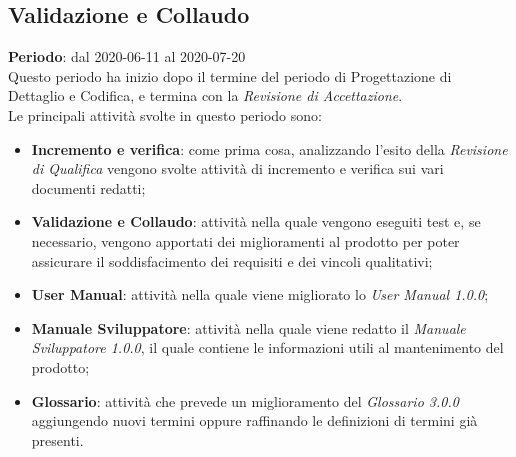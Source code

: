 \subsection{Validazione e Collaudo}
\textbf{Periodo}: dal 2020-06-11 al 2020-07-20 \\
Questo periodo ha inizio dopo il termine del periodo di Progettazione di Dettaglio e Codifica, e termina con la \textit{Revisione di Accettazione}. \\
Le principali attività svolte in questo periodo sono:
\begin{itemize}
	\item \textbf{Incremento e verifica}: come prima cosa, analizzando l'esito della \textit{Revisione di Qualifica} vengono svolte attività di incremento e verifica sui vari documenti redatti;
	\item \textbf{Validazione e Collaudo}: attività nella quale vengono eseguiti test e, se necessario, vengono apportati dei miglioramenti al prodotto per poter assicurare il soddisfacimento dei requisiti e dei vincoli qualitativi;
	\item \textbf{User Manual}: attività nella quale viene migliorato lo \textit{User Manual 1.0.0};
	\item \textbf{Manuale Sviluppatore}: attività nella quale viene redatto il \textit{Manuale Sviluppatore 1.0.0}, il quale contiene le informazioni utili al mantenimento del prodotto;
	\item \textbf{Glossario}: attività che prevede un miglioramento del \textit{Glossario 3.0.0} aggiungendo nuovi termini oppure raffinando le definizioni di termini già presenti.
\end{itemize}
